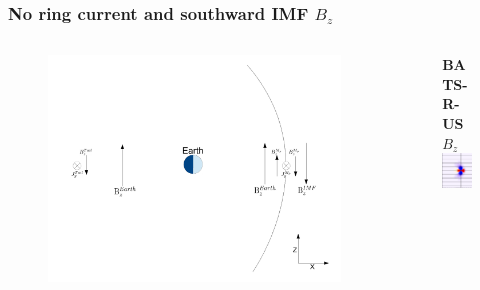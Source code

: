\begin{frame}
	\frametitle{No ring current and southward IMF $B_z$}
	\begin{columns}
	\begin{column}{.6\textwidth}
	\begin{figure}
		\includegraphics[scale=.23]{images/SimfNoRC.pdf}
	\end{figure}
	\end{column}
	\begin{column}{.4\textwidth}
	\begin{figure}
	\textbf{BATS-R-US $B_z$}\\
	\includegraphics[scale=.45]{images/SBzNoRCM.png}
	\end{figure}
	\end{column}
	\end{columns}
\end{frame}

